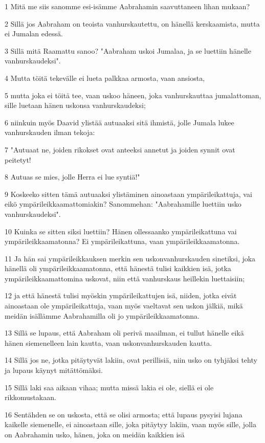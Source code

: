 \par 1 Mitä me siis sanomme esi-isämme Aabrahamin saavuttaneen lihan mukaan?
\par 2 Sillä jos Aabraham on teoista vanhurskautettu, on hänellä kerskaamista, mutta ei Jumalan edessä.
\par 3 Sillä mitä Raamattu sanoo? "Aabraham uskoi Jumalaa, ja se luettiin hänelle vanhurskaudeksi".
\par 4 Mutta töitä tekevälle ei lueta palkkaa armosta, vaan ansiosta,
\par 5 mutta joka ei töitä tee, vaan uskoo häneen, joka vanhurskauttaa jumalattoman, sille luetaan hänen uskonsa vanhurskaudeksi;
\par 6 niinkuin myös Daavid ylistää autuaaksi sitä ihmistä, jolle Jumala lukee vanhurskauden ilman tekoja:
\par 7 "Autuaat ne, joiden rikokset ovat anteeksi annetut ja joiden synnit ovat peitetyt!
\par 8 Autuas se mies, jolle Herra ei lue syntiä!"
\par 9 Koskeeko sitten tämä autuaaksi ylistäminen ainoastaan ympärileikattuja, vai eikö ympärileikkaamattomiakin? Sanommehan: "Aabrahamille luettiin usko vanhurskaudeksi".
\par 10 Kuinka se sitten siksi luettiin? Hänen ollessaanko ympärileikattuna vai ympärileikkaamatonna? Ei ympärileikattuna, vaan ympärileikkaamatonna.
\par 11 Ja hän sai ympärileikkauksen merkin sen uskonvanhurskauden sinetiksi, joka hänellä oli ympärileikkaamatonna, että hänestä tulisi kaikkien isä, jotka ympärileikkaamattomina uskovat, niin että vanhurskaus heillekin luettaisiin;
\par 12 ja että hänestä tulisi myöskin ympärileikattujen isä, niiden, jotka eivät ainoastaan ole ympärileikattuja, vaan myös vaeltavat sen uskon jälkiä, mikä meidän isällämme Aabrahamilla oli jo ympärileikkaamatonna.
\par 13 Sillä se lupaus, että Aabraham oli perivä maailman, ei tullut hänelle eikä hänen siemenelleen lain kautta, vaan uskonvanhurskauden kautta.
\par 14 Sillä jos ne, jotka pitäytyvät lakiin, ovat perillisiä, niin usko on tyhjäksi tehty ja lupaus käynyt mitättömäksi.
\par 15 Sillä laki saa aikaan vihaa; mutta missä lakia ei ole, siellä ei ole rikkomustakaan.
\par 16 Sentähden se on uskosta, että se olisi armosta; että lupaus pysyisi lujana kaikelle siemenelle, ei ainoastaan sille, joka pitäytyy lakiin, vaan myös sille, jolla on Aabrahamin usko, hänen, joka on meidän kaikkien isä
